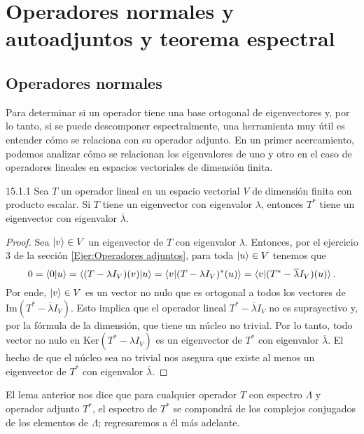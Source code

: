 \documentclass[12pt,libertine]{book}
\begin{document}
\newpage
\section{Operadores normales y autoadjuntos y teorema espectral} \label{Sec:15} 

\subsection*{Operadores normales} \label{Ssec:Operadores normales}

Para determinar si un operador tiene una base ortogonal de eigenvectores y, por lo tanto, si se puede descomponer espectralmente, una herramienta muy útil es entender cómo se relaciona con su operador adjunto. En un primer acercamiento, podemos analizar cómo se relacionan los eigenvalores de uno y otro en el caso de operadores lineales en  espacios vectoriales de dimensión finita.

\begin{Lema} {15.1.1} \label{Lema: 15.1.1}
    Sea $T$ un operador lineal en un espacio vectorial $V$ de dimensión finita con producto escalar. Si $T$ tiene un eigenvector con eigenvalor $\lambda$, entonces $T^*$ tiene un eigenvector con eigenvalor $\overline{\lambda}$.

    \begin{proof}
        Sea $\ket{v}\in V$ un eigenvector de $T$ con eigenvalor $\lambda$. Entonces, por el ejercicio 3 de la sección \ref{Ejer:Operadores adjuntos}, para toda $\ket{u}\in V$ tenemos que \[
            0=\braket{0|u}=\braket{(T-\lambda I_V)(v)|u}=\braket{v|(T-\lambda I_V)^*(u)}=\braket{v|(T^*-\overline{\lambda}I_V)(u)}.
        \] Por ende, $\ket{v}\in V$ es un vector no nulo que es ortogonal a todos los vectores de $\text{Im}(T^*-\overline{\lambda}I_V)$. Esto implica que el operador lineal $T^*-\overline{\lambda}I_V$ no es suprayectivo y, por la fórmula de la dimensión, que tiene un núcleo no trivial. Por lo tanto, todo vector no nulo en $\text{Ker}(T^*-\lambda I_V)$ es un eigenvector de $T^*$ con eigenvalor $\overline{\lambda}$. El hecho de que el núcleo sea no trivial nos asegura que existe al menos un eigenvector de $T^*$ con eigenvalor $\overline{\lambda}$.
    \end{proof}
\end{Lema}

El lema anterior nos dice que para cualquier operador $T$ con espectro $\Lambda$ y operador adjunto $T^*$, el espectro de $T^*$ se compondrá de los complejos conjugados de los elementos de $\Lambda$; regresaremos a él más adelante.
\end{document}
